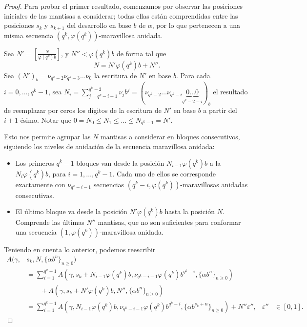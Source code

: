 \begin{proof}
Para probar el primer resultado,
comenzamos por observar las posiciones iniciales de las mantisas a considerar;
todas ellas están comprendidas entre las posiciones $s_k$ y $s_{k+1}$ del
desarrollo en base $b$ de $\alpha$, por lo que pertenecen a una misma
secuencia $(q^k, \varphi(q^k))$-maravillosa anidada.

Sea $N' = \left[ \frac{N}{\varphi(q^k)b} \right]$, y $N'' < \varphi(q^k)b$ de
forma tal que 
\[ N = N'\varphi(q^k)b + N''. \]
Sea $(N')_b = \nu_{q^k-2}\nu_{q^k-3}\dots\nu_0$
la escritura de $N'$ en base $b$. Para cada $i = 0, \dots, q^k-1$, sea
$N_i = \sum_{j=q^k-i-1}^{q^k-2} \nu_{j}b^{j}
= (\nu_{q^k-2}\dots\nu_{q^k-i}\underbrace{0\dots0}_{q^k-2-i})_b$
el resultado de reemplazar por ceros los dígitos de la
escritura de $N'$ en base $b$ a partir del $i+1$-ésimo.
Notar que $0 = N_0 \leq N_1 \leq \dots \leq N_{q^k-1} = N'$.

Esto nos permite agrupar las $N$ mantisas a considerar en bloques consecutivos,
siguiendo los niveles de anidación de la secuencia maravillosa anidada:
\begin{itemize}
	\item Los primeros $q^k - 1$ bloques van desde la posición
		$N_{i-1}\varphi(q^k)b$ a la $N_{i}\varphi(q^k)b$,
		para $i = 1, \dots, q^k - 1$. Cada uno de ellos se corresponde
		exactamente con $\nu_{q^k-i-1}$ secuencias
		$(q^k - i, \varphi(q^k))$-maravillosas anidadas consecutivas.
	\item El último bloque va desde la posición $N'\varphi(q^k)b$ hasta la
		posición $N$. Comprende las últimas $N''$ mantisas, que no son suficientes
		para conformar una secuencia $(1, \varphi(q^k))$-maravillosa anidada.
\end{itemize}

\medskip

Teniendo en cuenta lo anterior, podemos reescribir
\begin{align*}
	A(\gamma, &s_k, N, \lbrace \alpha b^{n} \rbrace_{n\geq0}) \\
	&= \sum_{i=1}^{q^k-1} A\left(\gamma, s_k + N_{i-1}\varphi(q^k)b, \nu_{q^k-i-1}
		\varphi(q^k)b^{q^k-i}, \lbrace \alpha b^{n} \rbrace_{n\geq0} \right) \\
	& \qquad + A\left(\gamma, s_k + N' \varphi(q^k)b, N'',
		\lbrace \alpha b^{n} \rbrace_{n\geq0} \right) \\
	&= \sum_{i=1}^{q^k-1} A\left(\gamma, N_{i-1}\varphi(q^k)b,
		\nu_{q^k-i-1}\varphi(q^k)b^{q^k-i}, \lbrace \alpha b^{s_k+n}
		\rbrace_{n\geq0} \right) + N''\varepsilon'', & \varepsilon'' &\in [0, 1].
\end{align*}


\end{proof}
